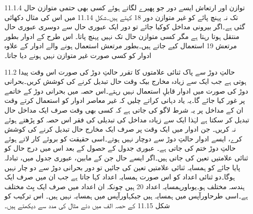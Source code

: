 11.1.4 توازن اور ارتعاش 
	 ایسے دور جو پھیرے لگاتے ہوئے کسی بھی حتمی متوازن حال تک نہ پہنچ پائے کو غیر متوازن دور 18 کہتے ہیں۔شکل 11.14 میں اس کی مثال دکھائی گئی ہے۔اگر بیرونی مداخل کوکیا جائے تو دور ایک عبوری حال سے دوسری عبوری حال منتقل ہوتا رہتا ہے مگر کسی متوازن حال تک نہیں پہنچ پاتا۔
	اس طرح کے ادوار بطور مرتعش 19 استعمال کیے جاتے ہیں۔بطور مرتعش استعمال ہونے والے ادوار کے علاوہ ادوار کو کسی صورت غیر متوازن نہیں ہونے دیا جاتا۔

11.2 حالتِ دوڑ سے پاک ثنائی علامتوں کا تقرر
	حالتِ دوڑ کی صورت اس وقت پیدا ہوتی ہے جب ایک سے زیادہ مخارج بیک وقت حال تبدیل کرنے کی کوشش کریں۔بحرانی دوڑ کی صورت میں ادوار قابلِ استعمال نہیں رہتے۔اس حصہ میں بحرانی دوڑ کے خاتمے پر غور کیا جائے گا۔یہ یاد دہانی کراتے چلیں کہ غیر معاصر ادوار کو استعمال کرتے وقت ان کے مداخل پر یہ شرط لاگو کی جاتی ہے کہ کسی بھی وقت صرف ایک مداخل حال تبدیل کر سکتا ہے لہٰذا ایک سے زیادہ مداخل کی تبدیلی کی فقر اس حصہ کو پڑھتے ہوئے نہ کریں۔
	جن ادوار میں ایک وقت پر صرف ایک مخارج حال تبدیل کرنے کی کوشش کرے، ایسے ادوار حالتِ دوڑ سے دوچار نہیں ہوتے۔اسی حقیقت کو بروئے کار لاتے ہوئے حالتِ دوڑ ختم کی جاتی ہے۔
	عبوری جدول کے حصول کے بعد اس میں درج حال  کو ثنائی علامتیں تعین کی جاتی ہیں۔اگر ایسے حال جن کے مابین، عبوری جدول میں، تبادلہ پایا جائے کو  ہمسایہ ثنائی علامتیں تعین کی جائیں تو دور بحرانی دوڑ سے دو چار نہیں ہوگا۔دو ثنائی اعداد کو اس صورت ہمسایہ اعداد کہا جاتا ہے جب ان میں صرف ایک ہندسہ مختلف ہو۔یوںاورہمسایہ اعداد 20 ہیں چونکہ ان اعداد میں صرف ایک بِٹ مختلف ہے۔اسی طرحاورآپس میں ہمسایہ ہیں جبکہاورآپس میں ہمسایہ نہیں ہیں۔
	اس ترکیب کو شکل 11.15 کے حصہ الف میں دئے مثال کی مدد سے دیکھتے ہیں۔



